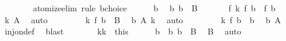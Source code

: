 \begin{isabellebody}
\ \ \ \ \ \ \isamarkupfalse%
\ atomize{\isacharunderscore}{\kern0pt}elim\ {\isacharparenleft}{\kern0pt}rule\ bchoice{\isacharparenright}{\kern0pt}\isanewline
\ \ \ \ \isacommand{{\isacharbraceleft}{\kern0pt}}\isamarkupfalse%
\isamarkupfalse%
\ b{}\ \isamarkupfalse%
\ b{}{\isacharcolon}{\kern0pt}\ {\isachardoublequoteopen}b{}\ {\isasymin}\ B{}{\isachardoublequoteclose}\isanewline
\ \ \ \ \ \isamarkupfalse%
\ {\isachardoublequoteopen}f{}\ {\isacharparenleft}{\kern0pt}k\ {\isacharparenleft}{\kern0pt}f{}\ b{}{\isacharparenright}{\kern0pt}{\isacharparenright}{\kern0pt}\ {\isacharequal}{\kern0pt}\ f{}\ b{}{\isachardoublequoteclose}\ \isamarkupfalse%
\ k\ A{}{\isacharparenleft}{\kern0pt}{}{\isacharparenright}{\kern0pt}\ \isamarkupfalse%
\ auto\isanewline
\ \ \ \ \ \isamarkupfalse%
\ \isamarkupfalse%
\ {\isachardoublequoteopen}k\ {\isacharparenleft}{\kern0pt}f{}\ b{}{\isacharparenright}{\kern0pt}\ {\isasymin}\ B{}{\isachardoublequoteclose}\ \isamarkupfalse%
\ b{}\ A{}{\isacharparenleft}{\kern0pt}{}{\isacharparenright}{\kern0pt}\ k\ \isamarkupfalse%
\ auto\isanewline
\ \ \ \ \ \isamarkupfalse%
\ \isamarkupfalse%
\ {\isachardoublequoteopen}k\ {\isacharparenleft}{\kern0pt}f{}\ b{}{\isacharparenright}{\kern0pt}\ {\isacharequal}{\kern0pt}\ b{}{\isachardoublequoteclose}\ \isamarkupfalse%
\ b{}\ A{}{\isacharparenleft}{\kern0pt}{}{\isacharparenright}{\kern0pt}\ \isamarkupfalse%
\ inj{\isacharunderscore}{\kern0pt}on{\isacharunderscore}{\kern0pt}def\ \isamarkupfalse%
\ blast\isanewline
\ \ \ \ \isacommand{{\isacharbraceright}{\kern0pt}}\isamarkupfalse%
\ \isamarkupfalse%
\ kk\ {\isacharequal}{\kern0pt}\ this\isanewline
\ \ \ \ \isamarkupfalse%
\ b{}{}\ \ b{}{}{\isacharcolon}{\kern0pt}\ {\isachardoublequoteopen}b{}{}\ {\isasymin}\ B{}{\isachardoublequoteclose}\ \isamarkupfalse%
\ B{}\ \isamarkupfalse%
\ auto\isanewline
\ \ \ \ \isamarkupfalse%

\end{isabellebody}
